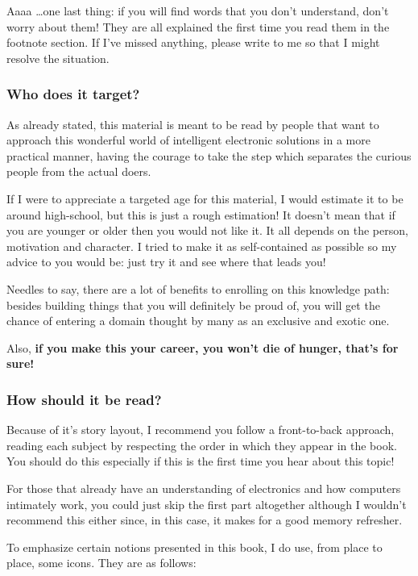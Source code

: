\documentclass[12pt, a4paper]{book}
\begin{document}
Aaaa \ldots one last thing: if you will find words that you don't understand, don't worry about them! They are all explained the first time you read them in the footnote section. If I've missed anything, please write to me so that I might resolve the situation.

\subsubsection{Who does it target?}

As already stated, this material is meant to be read by people that want to approach this wonderful world of intelligent electronic solutions in a more practical manner, having the courage to take the step which separates the curious people from the actual doers.

If I were to appreciate a targeted age for this material, I would estimate it to be around high-school, but this is just a rough estimation! It doesn't mean that if you are younger or older then you would not like it. It all depends on the person, motivation and character. I tried to make it as self-contained as possible so my advice to you would be: just try it and see where that leads you!   

Needles to say, there are a lot of benefits to enrolling on this knowledge path: besides building things that you will definitely be proud of, you will get the chance of entering a domain thought by many as an exclusive and exotic one. 

Also, \textbf{if you make this your career, you won't die of hunger, that's for sure!}

\subsubsection{How should it be read?}

Because of it's story layout, I recommend you follow a front-to-back approach, reading each subject by respecting the order in which they appear in the book. You should do this especially if this is the first time you hear about this topic!

For those that already have an understanding of electronics and how computers intimately work, you could just skip the first part altogether although I wouldn't recommend this either since, in this case, it makes for a good memory refresher.

To emphasize certain notions presented in this book, I do use, from place to place, some icons. They are as follows:
\end{document}
